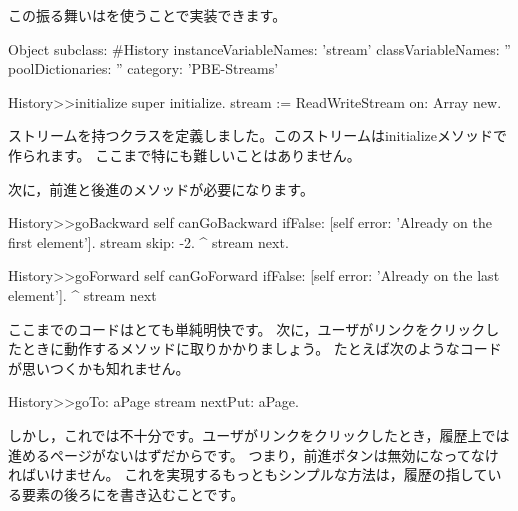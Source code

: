 \documentclass[a4paper,10pt,twoside]{book}
\begin{document}
この振る舞いはを使うことで実装できます。

\begin{code}{}
Object subclass: #History
  instanceVariableNames: 'stream'
  classVariableNames: ''
  poolDictionaries: ''
  category: 'PBE-Streams'

History>>initialize
    super initialize.
    stream := ReadWriteStream on: Array new.
\end{code}

ストリームを持つクラスを定義しました。このストリームはinitializeメソッドで作られます。
ここまで特にも難しいことはありません。

次に，前進と後進のメソッドが必要になります。

\begin{code}{}
History>>goBackward
  self canGoBackward ifFalse: [self error: 'Already on the first element'].
  stream skip: -2.
  ^ stream next.

History>>goForward
  self canGoForward ifFalse: [self error: 'Already on the last element'].
  ^ stream next
\end{code}

ここまでのコードはとても単純明快です。
次に，ユーザがリンクをクリックしたときに動作するメソッドに取りかかりましょう。
たとえば次のようなコードが思いつくかも知れません。

\begin{code}{}
History>>goTo: aPage
    stream nextPut: aPage.
\end{code}

しかし，これでは不十分です。ユーザがリンクをクリックしたとき，履歴上では進めるページがないはずだからです。
つまり，前進ボタンは無効になってなければいけません。
これを実現するもっともシンプルな方法は，履歴の指している要素の後ろにを書き込むことです。
\end{document}

